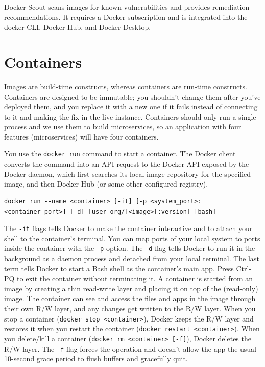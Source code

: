 \documentclass[table, xcdraw]{article}%
\begin{document}
Docker Scout scans images for known vulnerabilities and provides remediation recommendations. It requires a Docker subscription and is integrated into the docker CLI, Docker Hub, and Docker Desktop.

\section{Containers}

Images are build-time constructs, whereas containers are run-time constructs. Containers are designed to be immutable; you shouldn’t change them after you’ve deployed them, and you replace it with a new one if it fails instead of connecting to it and making the fix in the live instance. Containers should only run a single process and we use them to build microservices, so an application with four features (microservices) will have four containers.

You use the \texttt{docker run} command to start a container. The Docker client converts the command into an API request to the Docker API exposed by the Docker daemon, which first searches its local image repository for the specified image, and then Docker Hub (or some other configured registry).

\begin{verbatim}
docker run --name <container> [-it] [-p <system_port>:<container_port>] [-d] [user_org/]<image>[:version] [bash]
\end{verbatim}

The \texttt{-it} flags tells Docker to make the container interactive and to attach your shell to the container’s terminal. You can map ports of your local system to ports inside the container with the \texttt{-p} option. The \texttt{-d} flag tells Docker to run it in the background as a daemon process and detached from your local terminal. The last term tells Docker to start a Bash shell as the container’s main app. Press Ctrl-PQ to exit the container without terminating it.
A container is started from an image by creating a thin read-write layer and placing it on top of the (read-only) image. The container can see and access the files and apps in the image through their own R/W layer, and any changes get written to the R/W layer. When you stop a container (\texttt{docker stop <container>}), Docker keeps the R/W layer and restores it when you restart the container (\texttt{docker restart <container>}). When you delete/kill a container (\texttt{docker rm <container> [-f]}), Docker deletes the R/W layer. The \texttt{-f} flag forces the operation and doesn’t allow the app the usual 10-second grace period to flush buffers and gracefully quit.
\end{document}
